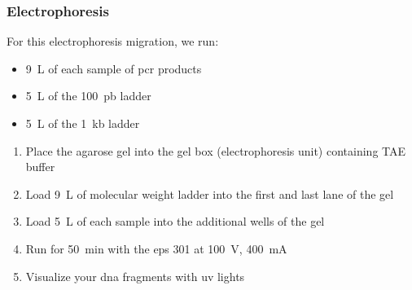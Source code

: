 \subsubsection{Electrophoresis}

For this electrophoresis migration, we run:
\begin{itemize}
\item 9~\textmu L of each sample of \gls{pcr} products
\item 5~\textmu L of the 100~pb ladder
\item 5~\textmu L of the 1~kb ladder
\end{itemize}

\begin{enumerate}
\item Place the agarose gel into the gel box (electrophoresis unit) containing TAE buffer
\item Load 9~\textmu L of molecular weight ladder into the first and last lane of the gel
\item Load 5~\textmu L of each sample into the additional wells of the gel
\item Run for 50~min with the \gls{eps} 301 at 100~V, 400~mA
\item Visualize your \gls{dna} fragments with \gls{uv} lights
\end{enumerate}

